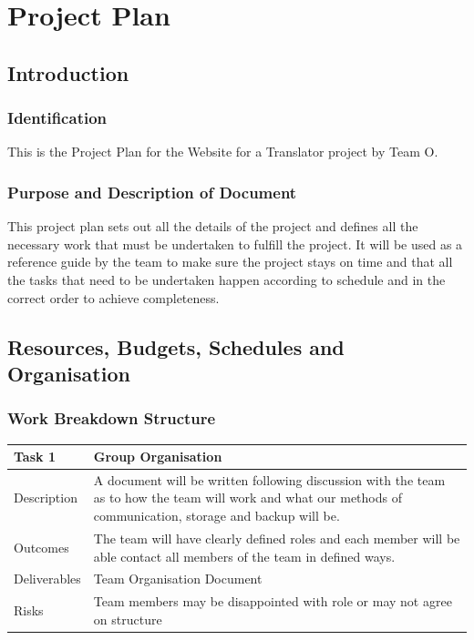 \documentclass{l3proj}
\begin{document}
\chapter{Project Plan}
\label{chap:proj-plan}
\section{Introduction}
\label{sect:pp-intro}
\subsection{Identification}
This is the Project Plan for the Website for a Translator project by Team O.

\subsection{Purpose and Description of Document}
This project plan sets out all the details of the project and defines all the
necessary work that must be undertaken to 
fulfill the project. It will be used as a reference guide by the team to make
sure the project stays on time and that all the tasks 
that need to be undertaken happen according to schedule and in the correct order to achieve completeness.

\section{Resources, Budgets, Schedules and Organisation}
\label{sect:rbso}
\subsection{Work Breakdown Structure} 

\begin{center}
    \begin{tabular}{ | l | p{12cm} |}
    \hline	
    Task 1 & Group Organisation \\ \hline
    Description & A document will be written following discussion with the team as to how the
	team will work and what our methods of communication, storage and backup will be. \\ \hline   
    Outcomes & The team will have clearly defined roles and each member will be able contact all members of the team in defined ways. \\ \hline
    Deliverables & Team Organisation Document \\ \hline
    Risks & Team members may be disappointed with role or may not agree on structure \\ 
    \hline
    \end{tabular}
\end{center}
\end{document}
